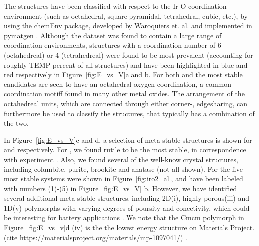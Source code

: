 %
The structures have been classified with respect to the Ir-O coordination environment
(such as octahedral, square pyramidal, tetrahedral, cubic, etc.),
by using the chemEnv package, developed by Waroquiers et. al. \cite{Waroquiers2017} and implemented in pymatgen \cite{Ong2013}.
%
Although the dataset was found to contain a large range of coordination environments,
structures with a coordination number of 6 (octahedreal) or 4 (tetrahedreal) were found to be most prevalent
(accounting for roughly TEMP percent of all structures)
and have been highlighted in blue and red respectively in Figure~\ref{fig:E_vs_V}a and b.
%
For both \IrOtwo and \IrOthree the most stable candidates are seen to have an octahedral oxygen coordination,
a common coordination motiff found in many other metal oxides.\cite{Waroquiers2017}
%
The arrangement of the octahedreal units, which are connected through either corner-, edgesharing,
can furthermore be used to classify the structures, that typically has a combination of the two. 


%
In Figure~\ref{fig:E_vs_V}c and d, a selection of meta-stable structures is shown for \IrOtwo and \IrOthree respectively.
%
For \IrOtwo, we found rutile to be the most stable,
in correspondence with experiment \cite{}.
%
Also, we found several of the well-know \IrOtwo crystal structures, including columbite, purite, brookite and anatase (not all shown).
% 
For \IrOthree the five most stable systems were shown in Figure~\ref{fig:iro2_al},
and have been labeled with numbers (1)-(5) in Figure~\ref{fig:E_vs_V} b.
%
However, we have identified several additional meta-stable structures, including 2D(i), highly porous(iii) and 1D(v) polymorphs with varying degrees of poursity and conectivity,
which could be interesting for battery applications \cite{}.
%
We note that the \IrOthree Cmcm polymorph in Figure~\ref{fig:E_vs_v}d (iv) is the the lowest energy \IrOthree structure on Materials Project.
(cite https://materialsproject.org/materials/mp-1097041/) \cite{}.




